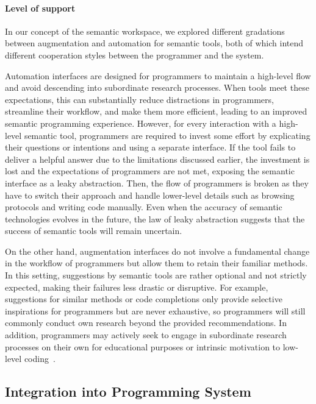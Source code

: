 \paragraph{Level of support}
\label{par:discussion/experience/process/support}

In our concept of the semantic workspace, we explored different gradations between augmentation and automation for semantic tools, both of which intend different cooperation styles between the programmer and the system.

Automation interfaces are designed for programmers to maintain a high-level flow and avoid descending into subordinate research processes.
When tools meet these expectations, this can substantially reduce distractions in programmers, streamline their workflow, and make them more efficient, leading to an improved semantic programming experience.
However, for every interaction with a high-level semantic tool, programmers are required to invest some effort by explicating their questions or intentions and using a separate interface.
If the tool fails to deliver a helpful answer due to the limitations discussed earlier, the investment is lost and the expectations of programmers are not met, exposing the semantic interface as a leaky abstraction.
Then, the flow of programmers is broken as they have to switch their approach and handle lower-level details such as browsing protocols and writing code manually.
Even when the accuracy of semantic technologies evolves in the future, the law of leaky abstraction suggests that the success of semantic tools will remain uncertain.

On the other hand, augmentation interfaces do not involve a fundamental change in the workflow of programmers but allow them to retain their familiar methods.
In this setting, suggestions by semantic tools are rather optional and not strictly expected, making their failures less drastic or disruptive.
For example, suggestions for similar methods or code completions only provide selective inspirations for programmers but are never exhaustive, so programmers will still commonly conduct own research beyond the provided recommendations.
In addition, programmers may actively seek to engage in subordinate research processes on their own for educational purposes or intrinsic motivation to low-level coding~\cite{tanimoto2023five}.

\subsection*{Integration into Programming System}
\label{sec:discussion/experience/integration}

